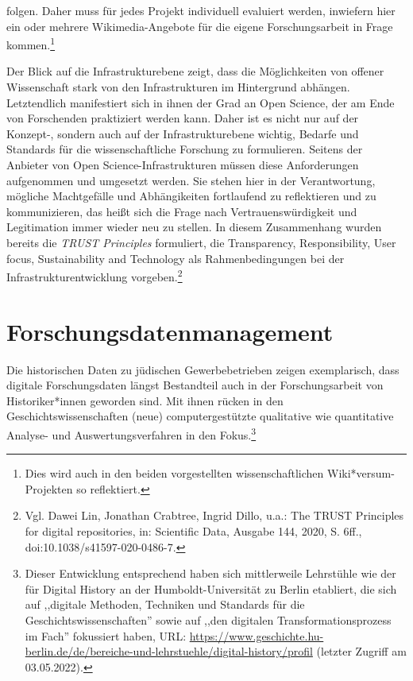 \begin{enumerate}
folgen. Daher muss für jedes Projekt individuell evaluiert werden, inwiefern hier ein oder mehrere Wikimedia-Angebote für die eigene Forschungsarbeit in Frage kommen.\footnote{Dies wird auch in den beiden vorgestellten wissenschaftlichen Wiki*versum-Projekten so reflektiert.}    
\end{enumerate}

Der Blick auf die Infrastrukturebene zeigt, dass die Möglichkeiten von offener Wissenschaft stark von den Infrastrukturen im Hintergrund abhängen. Letztendlich manifestiert sich in ihnen der Grad an Open Science, der am Ende von Forschenden praktiziert werden kann. Daher ist es nicht nur auf der Konzept-, sondern auch auf der Infrastrukturebene wichtig, Bedarfe und Standards für die wissenschaftliche Forschung zu formulieren. Seitens der Anbieter von Open Science-Infrastrukturen müssen diese Anforderungen aufgenommen und umgesetzt werden. Sie stehen hier in der Verantwortung, mögliche Machtgefälle und Abhängikeiten fortlaufend zu reflektieren und zu kommunizieren, das heißt sich die Frage nach Vertrauenswürdigkeit und Legitimation immer wieder neu zu stellen. In diesem Zusammenhang wurden bereits die \textit{TRUST Principles} formuliert, die Transparency, Responsibility, User focus, Sustainability and Technology als Rahmenbedingungen bei der Infrastrukturentwicklung vorgeben.\footnote{Vgl. Dawei Lin, Jonathan Crabtree, Ingrid Dillo, u.a.: The TRUST Principles for digital repositories, in: Scientific Data, Ausgabe 144, 2020, S. 6ff., doi:10.1038/s41597-020-0486-7.}

\section{Forschungsdatenmanagement}

Die historischen Daten zu jüdischen Gewerbebetrieben zeigen exemplarisch, dass digitale Forschungsdaten längst Bestandteil auch in der Forschungsarbeit von Historiker*innen geworden sind. Mit ihnen rücken in den Geschichtswissenschaften (neue) computergestützte qualitative wie quantitative Analyse- und Auswertungsverfahren in den Fokus.\footnote{Dieser Entwicklung entsprechend haben sich mittlerweile Lehrstühle wie der für Digital History an der Humboldt-Universität zu Berlin etabliert, die sich auf ,,digitale Methoden, Techniken und Standards für die Geschichtswissenschaften'' sowie auf ,,den digitalen Transformationsprozess im Fach'' fokussiert haben, URL: \url{https://www.geschichte.hu-berlin.de/de/bereiche-und-lehrstuehle/digital-history/profil} (letzter Zugriff am 03.05.2022).}

